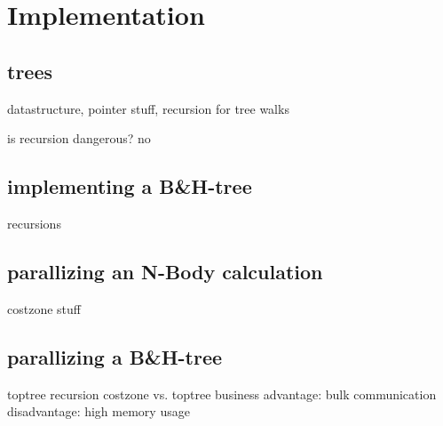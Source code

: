 
\section{Implementation}

\subsection{trees}

datastructure, pointer stuff, recursion for tree walks

is recursion dangerous? no

\subsection{implementing a B\&H-tree}

recursions

\subsection{parallizing an N-Body calculation}

costzone stuff

\subsection{parallizing a B\&H-tree}

toptree recursion
costzone vs. toptree business
advantage: bulk communication
disadvantage: high memory usage